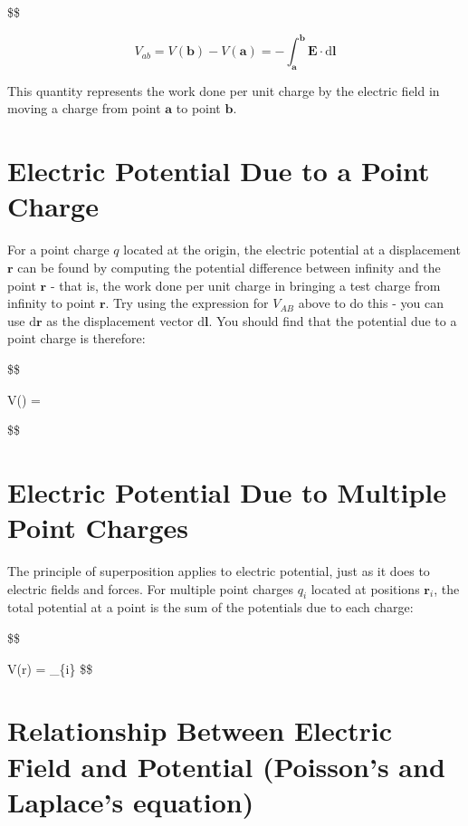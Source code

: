 \documentclass[
  letterpaper,
  DIV=11,
  numbers=noendperiod]{scrreprt}
\begin{document}
\$\$

\[ V_{ab} = V(\mathrm{\mathbf{b}}) − V(\mathrm{\mathbf{a}}) = -\int_{\mathrm{\mathbf{a}}}^{\mathrm{\mathbf{b}}} \mathrm{\mathbf{E}}\cdot \mathrm{d} \mathrm{\mathbf{l}}\]

This quantity represents the work done per unit charge by the electric
field in moving a charge from point \(\mathrm{\mathbf{a}}\) to point
\(\mathrm{\mathbf{b}}\).

\section{Electric Potential Due to a Point
Charge}\label{electric-potential-due-to-a-point-charge}

For a point charge \(q\) located at the origin, the electric potential
at a displacement \(\mathrm{\mathbf{r}}\) can be found by computing the
potential difference between infinity and the point
\(\mathrm{\mathbf{r}}\) - that is, the work done per unit charge in
bringing a test charge from infinity to point \(\mathrm{\mathbf{r}}\).
Try using the expression for \(V_{AB}\) above to do this - you can use
\(\mathrm{d}\mathrm{\mathbf{r}}\) as the displacement vector
\(\mathrm{d}\mathrm{\mathbf{l}}\). You should find that the potential
due to a point charge is therefore:

\$\$

V() = 

\$\$

\section{Electric Potential Due to Multiple Point
Charges}\label{electric-potential-due-to-multiple-point-charges}

The principle of superposition applies to electric potential, just as it
does to electric fields and forces. For multiple point charges \(q_i\)
located at positions \(\mathrm{\mathbf{r}}_i\), the total potential at a
point is the sum of the potentials due to each
charge:

\$\$

V(r) =  \sum\_\{i\}
 \$\$

\section{Relationship Between Electric Field and Potential (Poisson's
and Laplace's
equation)}\label{relationship-between-electric-field-and-potential-poissons-and-laplaces-equation}
\end{document}
